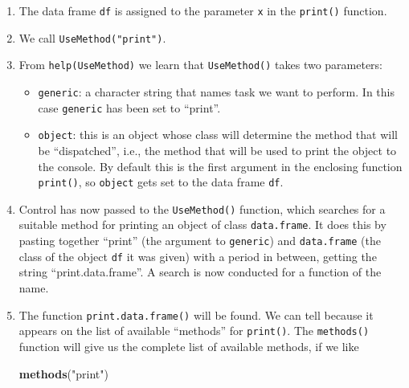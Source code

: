 \documentclass[]{book}
\makeatletter
\newenvironment{Shaded}{\begin{snugshade}}{\end{snugshade}}
\newcommand{\KeywordTok}[1]{\textcolor[rgb]{0.13,0.29,0.53}{\textbf{#1}}}
\newcommand{\StringTok}[1]{\textcolor[rgb]{0.31,0.60,0.02}{#1}}
\newcommand{\NormalTok}[1]{#1}
\providecommand{\tightlist}{%
  \setlength{\itemsep}{0pt}\setlength{\parskip}{0pt}}
\newenvironment{kframe}{%
\medskip{}
\setlength{\fboxsep}{.8em}
 \def\at@end@of@kframe{}%
 \ifinner\ifhmode%
  \def\at@end@of@kframe{\end{minipage}}%
  \begin{minipage}{\columnwidth}%
 \fi\fi%
 \def\FrameCommand##1{\hskip\@totalleftmargin \hskip-\fboxsep
 \colorbox{shadecolor}{##1}\hskip-\fboxsep
     \hskip-\linewidth \hskip-\@totalleftmargin \hskip\columnwidth}%
 \MakeFramed {\advance\hsize-\width
   \@totalleftmargin\z@ \linewidth\hsize
   \@setminipage}}%
 {\par\unskip\endMakeFramed%
 \at@end@of@kframe}
\renewenvironment{Shaded}{\begin{kframe}}{\end{kframe}}
\theoremstyle{definition}
\theoremstyle{definition}
\theoremstyle{definition}
\theoremstyle{remark}
\makeatother
\begin{document}
{\begin{enumerate}
\def\labelenumi{\arabic{enumi}.}
\item
  The data frame \texttt{df} is assigned to the parameter \texttt{x} in
  the \texttt{print()} function.
\item
  We call \texttt{UseMethod("print")}.
\item
  From \texttt{help(UseMethod)} we learn that \texttt{UseMethod()} takes
  two parameters:

  \begin{itemize}
  \tightlist
  \item
    \texttt{generic}: a character string that names task we want to
    perform. In this case \texttt{generic} has been set to ``print''.
  \item
    \texttt{object}: this is an object whose class will determine the
    method that will be ``dispatched'', i.e., the method that will be
    used to print the object to the console. By default this is the
    first argument in the enclosing function \texttt{print()}, so
    \texttt{object} gets set to the data frame \texttt{df}.
  \end{itemize}
\item
  Control has now passed to the \texttt{UseMethod()} function, which
  searches for a suitable method for printing an object of class
  \texttt{data.frame}. It does this by pasting together ``print'' (the
  argument to \texttt{generic}) and \texttt{data.frame} (the class of
  the object \texttt{df} it was given) with a period in between, getting
  the string ``print.data.frame''. A search is now conducted for a
  function of the name.
\item
  The function \texttt{print.data.frame()} will be found. We can tell
  because it appears on the list of available ``methods'' for
  \texttt{print()}. The \texttt{methods()} function
   will give us the
  complete list of available methods, if we like

\begin{Shaded}
\begin{Highlighting}[]
\KeywordTok{methods}\NormalTok{(}\StringTok{"print"}\NormalTok{)}
\end{Highlighting}
\end{Shaded}


\end{enumerate}}
\end{document}
